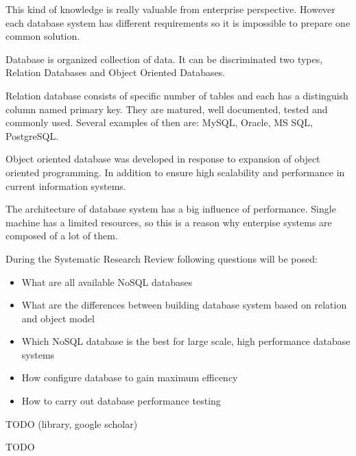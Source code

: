\documentclass[times, 10pt,twocolumn]{article}
\begin{document}
This kind of knowledge is really valuable from enterprise perspective. However each database
system has different requirements so it is impossible to prepare one common solution.
 

Database is organized collection of data. It can be discriminated two types, 
Relation Databases and Object Oriented Databases.

Relation database consists of specific number of tables and each has a distinguish column named primary key. 
They are matured, well documented, tested and commonly used. Several examples of then are: MySQL, Oracle, MS SQL, PostgreSQL. 

Object oriented database was developed in response to expansion of object oriented programming. In addition to ensure high scalability and  
performance in current information systems.

The architecture of database system has a big influence of performance. Single machine has a limited
resources, so this is a reason why enterpise systems  are composed of a lot of them.



During the Systematic Research Review following questions will be posed: 

\begin{itemize}
  \item What are all available NoSQL databases
  \item What are the differences between building database system based on relation and object model
  \item Which NoSQL database is the best for large scale, high performance database systems
  \item How configure database to gain maximum efficency
  \item How to carry out database performance testing
\end{itemize}


TODO (library, google scholar)


TODO

\end{document}
